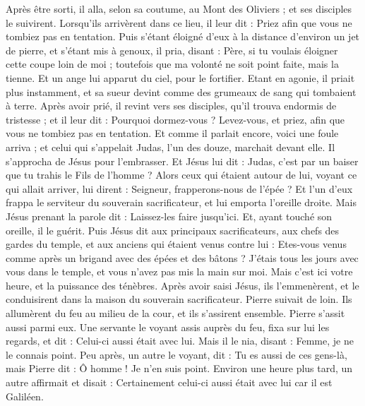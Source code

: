 \begin{multicols}{2}
Après être sorti, il alla, selon sa coutume, au Mont des Oliviers ; et ses disciples le suivirent.
Lorsqu’ils arrivèrent dans ce lieu, il leur dit : Priez afin que vous ne tombiez pas en tentation.
Puis s'étant éloigné d'eux à la distance d’environ un jet de pierre, et s'étant mis à genoux, il pria,
disant : Père, si tu voulais éloigner cette coupe loin de moi ; toutefois que ma volonté ne soit point faite, mais la tienne.
Et un ange lui apparut du ciel, pour le fortifier.
Etant en agonie, il priait plus instamment, et sa sueur devint comme des grumeaux de sang qui tombaient à terre.
Après avoir prié, il revint vers ses disciples, qu’il trouva endormis de tristesse ;
et il leur dit : Pourquoi dormez-vous ? Levez-vous, et priez, afin que vous ne tombiez pas en tentation.
Et comme il parlait encore, voici une foule arriva ; et celui qui s’appelait Judas, l'un des douze, marchait devant elle. Il s’approcha de Jésus pour l’embrasser.
Et Jésus lui dit : Judas, c’est par un baiser que tu trahis le Fils de l'homme ?
Alors ceux qui étaient autour de lui, voyant ce qui allait arriver, lui dirent : Seigneur, frapperons-nous de l'épée ?
Et l'un d'eux frappa le serviteur du souverain sacrificateur, et lui emporta l'oreille droite.
Mais Jésus prenant la parole dit : Laissez-les faire jusqu’ici. Et, ayant touché son oreille, il le guérit.
Puis Jésus dit aux principaux sacrificateurs, aux chefs des gardes du temple, et aux anciens qui étaient venus contre lui : Etes-vous venus comme après un brigand avec des épées et des bâtons ?
J’étais tous les jours avec vous dans le temple, et vous n'avez pas mis la main sur moi. Mais c'est ici votre heure, et la puissance des ténèbres.
Après avoir saisi Jésus, ils l'emmenèrent, et le conduisirent dans la maison du souverain sacrificateur. Pierre suivait de loin.
Ils allumèrent du feu au milieu de la cour, et ils s’assirent ensemble. Pierre s'assit aussi parmi eux.
Une servante le voyant assis auprès du feu, fixa sur lui les regards, et dit : Celui-ci aussi était avec lui.
Mais il le nia, disant : Femme, je ne le connais point.
Peu après, un autre le voyant, dit : Tu es aussi de ces gens-là, mais Pierre dit : Ô homme ! Je n'en suis point.
Environ une heure plus tard, un autre affirmait et disait : Certainement celui-ci aussi était avec lui car il est Galiléen.

\end{multicols}
